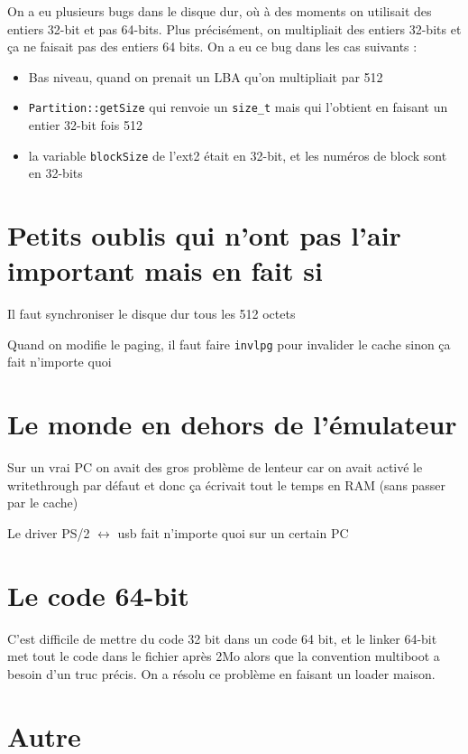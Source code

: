 \documentclass[12pt]{report}
\begin{document}
On a eu plusieurs bugs dans le disque dur, où à des moments on utilisait des entiers 32-bit et pas 64-bits.
Plus précisément, on multipliait des entiers 32-bits et ça ne faisait pas des entiers 64 bits.
On a eu ce bug dans les cas suivants :

\begin{itemize}
    \item Bas niveau, quand on prenait un LBA qu'on multipliait par 512
    \item \verb$Partition::getSize$ qui renvoie un \verb$size_t$ mais qui l'obtient en faisant un entier 32-bit fois 512
    \item la variable \verb$blockSize$ de l'ext2 était en 32-bit, et les numéros de block sont en 32-bits
\end{itemize}

\section*{Petits oublis qui n'ont pas l'air important mais en fait si}

Il faut synchroniser le disque dur tous les 512 octets

Quand on modifie le paging, il faut faire \verb$invlpg$ pour invalider le cache sinon ça fait n'importe quoi

\section*{Le monde en dehors de l'émulateur}

Sur un vrai PC on avait des gros problème de lenteur car on avait activé le writethrough par défaut et donc ça écrivait tout le temps en RAM (sans passer par le cache)

Le driver PS/2 $\longleftrightarrow$ usb fait n'importe quoi sur un certain PC

\section*{Le code 64-bit}

C'est difficile de mettre du code 32 bit dans un code 64 bit, et le linker 64-bit met tout le code dans le fichier après 2Mo alors que la convention multiboot a besoin d'un truc précis.
On a résolu ce problème en faisant un loader maison.

\section*{Autre}
\end{document}
